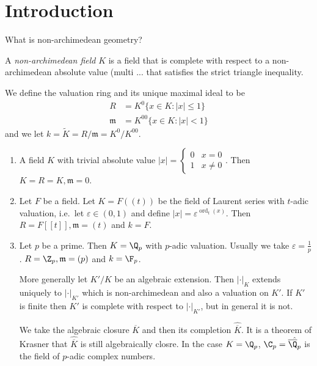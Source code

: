 \documentclass[a4paper]{article}
\begin{document}


\tableofcontents

\setcounter{section}{-1}

\section{Introduction}

What is non-archimedean geometry?

\begin{definition}
  A \emph{non-archimedean field} \(K\) is a field that is complete with respect to a non-archimedean absolute value (multi ... that satisfies the strict triangle inequality.
\end{definition}

\begin{notation}
  We define the valuation ring and its unique maximal ideal to be
  \begin{align*}
    R &= K^0 \{x \in K: |x| \leq 1\} \\
    \mathfrak m &= K^{00} \{x \in K: |x| < 1\}
  \end{align*}
  and we let \(k = \tilde K = R/\mathfrak m = K^0/K^{00}\).
\end{notation}

\begin{eg}\leavevmode
  \begin{enumerate}
  \item A field \(K\) with trivial absolute value \(|x| =
    \begin{cases}
      0 & x = 0 \\
      1 & x \ne 0
    \end{cases}
    \). Then \(K = R = K, \mathfrak m = 0\).
  \item Let \(F\) be a field. Let \(K = F((t))\) be the field of Laurent series with \(t\)-adic valuation, i.e.\ let \(\varepsilon \in (0, 1)\) and define \(|x| = \varepsilon^{\operatorname{ord}_t(x)}\). Then \(R = F[[t]], \mathfrak m = (t)\) and \(k = F\).
  \item Let \(p\) be a prime. Then \(K = \Q_p\) with \(p\)-adic valuation. Usually we take \(\varepsilon = \frac{1}{p}\). \(R = \Z_p, \mathfrak m = (p)\) and \(k = \F_p\).

    More generally let \(K'/K\) be an algebraic extension. Then \(|\cdot|_K\) extends uniquely to \(|\cdot|_{K'}\) which is non-archimedean and also a valuation on \(K'\). If \(K'\) is finite then \(K'\) is complete with respect to \(|\cdot|_{K'}\), but in general it is not.

    We take the algebraic closure \(\overline K\) and then its completion \(\hat{\overline K}\). It is a theorem of Krasner that \(\hat{\overline K}\) is still algebraically closre. In the case \(K = \Q_p\), \(\C_p = \hat{\overline \Q_p}\) is the field of \(p\)-adic complex numbers.
  \end{enumerate}
\end{eg}
\end{document}
